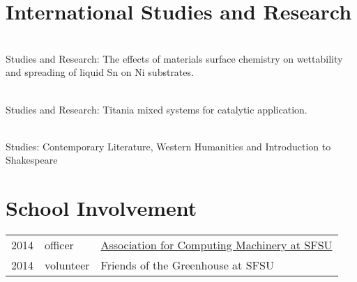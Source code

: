 \documentclass[]{resume-openfont}
\begin{document}
\begin{minipage}[t]{0.65\textwidth}
\section{International Studies and Research}
\\
Studies and Research: The effects of materials surface chemistry on wettability and spreading of liquid Sn on Ni substrates.
\sectionsep

\\
Studies and Research: Titania mixed systems for catalytic application.
\sectionsep

\\
Studies: Contemporary Literature, Western Humanities and Introduction to Shakespeare
\sectionsep

\section{School Involvement}
\begin{tabular}{rll}
2014 & officer & \href{http://sfsu.acm.org}{Association for Computing Machinery at SFSU}\\
2014 & volunteer & Friends of the Greenhouse at SFSU
\end{tabular}
\sectionsep

\end{minipage}
\end{document}
